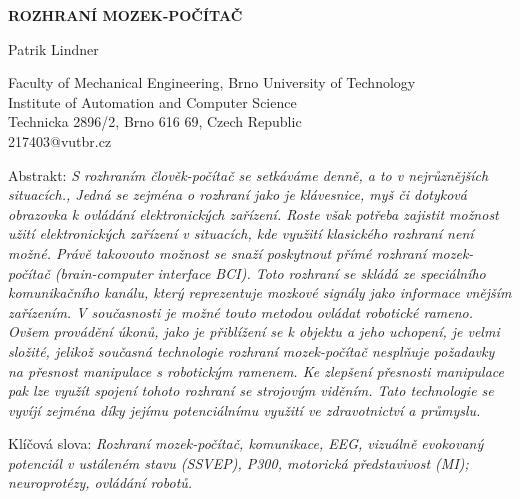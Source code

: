 \documentclass[a4paper,10pt]{article}
\theoremstyle{definition}
\begin{document}
\pagestyle{empty}

\begin{center}
{\bf \Large ROZHRANÍ MOZEK-POČÍTAČ}
\end{center}

\smallskip
\begin{center}
{\large Patrik Lindner}
\end{center}

\smallskip
\begin{center}
Faculty of Mechanical Engineering, Brno University of Technology\\
Institute of Automation and Computer Science\\
Technicka 2896/2, Brno 616 69, Czech Republic\\
217403@vutbr.cz\\
\end{center}

\bigskip
\noindent Abstrakt: \textit{S rozhraním člověk-počítač se setkáváme denně, a to v nejrůznějších situacích., Jedná se zejména o rozhraní jako je klávesnice, myš či dotyková obrazovka k ovládání elektronických zařízení. Roste však potřeba zajistit možnost užití elektronických zařízení v situacích, kde využití klasického rozhraní není možné. Právě takovouto možnost se snaží poskytnout přímé rozhraní mozek-počítač (brain-computer interface BCI). Toto rozhraní se skládá ze speciálního komunikačního kanálu, který reprezentuje mozkové signály jako informace vnějším zařízením. V současnosti je možné touto metodou ovládat robotické rameno. Ovšem provádění úkonů, jako je přiblížení se k objektu a jeho uchopení, je velmi složité, jelikož současná technologie rozhraní mozek-počítač nesplňuje požadavky na přesnost manipulace s robotickým ramenem. Ke zlepšení přesnosti manipulace pak lze využít spojení tohoto rozhraní se strojovým viděním. Tato technologie se vyvíjí zejména díky jejímu potenciálnímu využití ve zdravotnictví a průmyslu.}

\vspace*{10pt} \noindent Klíčová slova: \textit{Rozhraní mozek-počítač, komunikace, EEG, vizuálně evokovaný potenciál v ustáleném stavu (SSVEP), P300, motorická představivost (MI); neuroprotézy, ovládání robotů.}

\bigskip
\end{document}
